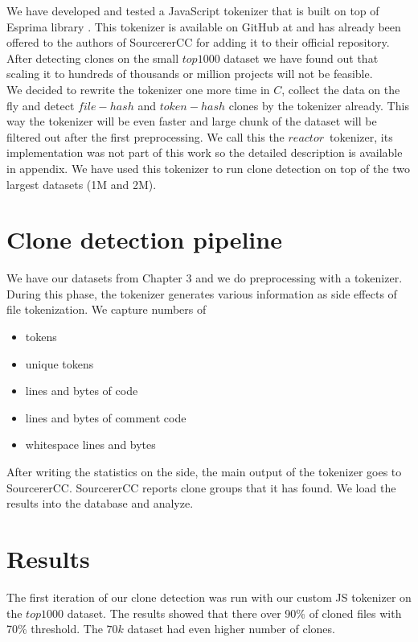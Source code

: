 \documentclass[thesis=M,english]{FITthesis}[2012/10/20]
\begin{document}
We have developed and tested a JavaScript tokenizer that is built on top of Esprima library \cite{lib_esprima}. This tokenizer is available on GitHub at \cite{gh_tokenizer_source} and has already been offered to the authors of SourcererCC for adding it to their official repository. \\

After detecting clones on the small $top1000$ dataset we have found out that scaling it to hundreds of thousands or million projects will not be feasible. \\

We decided to rewrite the tokenizer one more time in $C$, collect the data on the fly and detect $file-hash$ and $token-hash$ clones by the tokenizer already. This way the tokenizer will be even faster and large chunk of the dataset will be filtered out after the first preprocessing. We call this the $reactor$ tokenizer, its implementation was not part of this work so the detailed description is available in appendix. We have used this tokenizer to run clone detection on top of the two largest datasets (1M and 2M). \\

\section{Clone detection pipeline}
We have our datasets from Chapter 3 and we do preprocessing with a tokenizer. During this phase, the tokenizer generates various information as side effects of file tokenization. We capture numbers of

\begin{itemize}
\item tokens
\item unique tokens
\item lines and bytes of code
\item lines and bytes of comment code
\item whitespace lines and bytes
\end{itemize}

After writing the statistics on the side, the main output of the tokenizer goes to SourcererCC. SourcererCC reports clone groups that it has found. We load the results into the database and analyze.


\section{Results}

The first iteration of our clone detection was run with our custom JS tokenizer on the $top1000$ dataset. The results showed that there over 90\% of cloned files with 70\% threshold. The $70k$ dataset had even higher number of clones. \\
\end{document}
